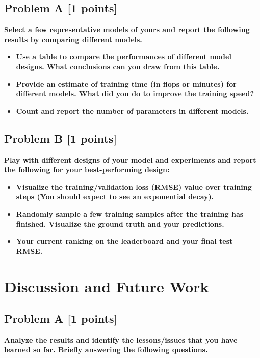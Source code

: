 \documentclass{article}
\begin{document}
    \subsection{Problem A [1 points]}
      \textbf{Select a few representative models of yours and report the following results by comparing different models.} 
      
      \begin{itemize}
        \item \textbf{Use a table to compare the performances of different model designs. What conclusions can you draw from this table.}
        \item \textbf{Provide an estimate of training time (in flops or minutes) for different models. What
        did you do to improve the training speed?}
        \item \textbf{Count and report the number of parameters in different models.}
      \end{itemize}

    \subsection{Problem B [1 points]}
      \textbf{Play with different designs of your model and experiments and report the following for your best-performing design:} 
      
      \begin{itemize}
        \item \textbf{Visualize the training/validation loss (RMSE) value over training steps (You should
        expect to see an exponential decay).}
        \item \textbf{Randomly sample a few training samples after the training has finished. Visualize
        the ground truth and your predictions.}
        \item \textbf{Your current ranking on the leaderboard and your final test RMSE.}
      \end{itemize}
    
  \section{Discussion and Future Work}\label{future-work}
    \subsection{Problem A [1 points]}
      \textbf{Analyze the results and identify the lessons/issues that you have learned so far. Briefly answering the following questions.} 
      
\end{document}
